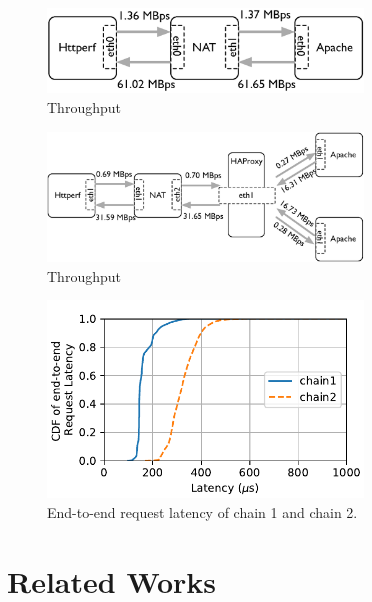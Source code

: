 \documentclass{sig-alternate-10pt}
\begin{document}
\begin{figure}[t]
\label{cdf}
\centering
\includegraphics[width=3.3in]{throughput_chain1.eps}
\caption{Throughput}
\end{figure}


\begin{figure}[t]
\label{cdf}
\centering
\includegraphics[width=3.3in]{throughput_chain2.eps}
\caption{Throughput}
\end{figure}


\begin{figure}[t]
\label{cdf}
\centering
\includegraphics[width=3.3in]{e2e_latency_chain12.pdf}
\caption{End-to-end request latency of chain 1 and chain 2.}
\end{figure}

\section{Related Works}
\end{document}
